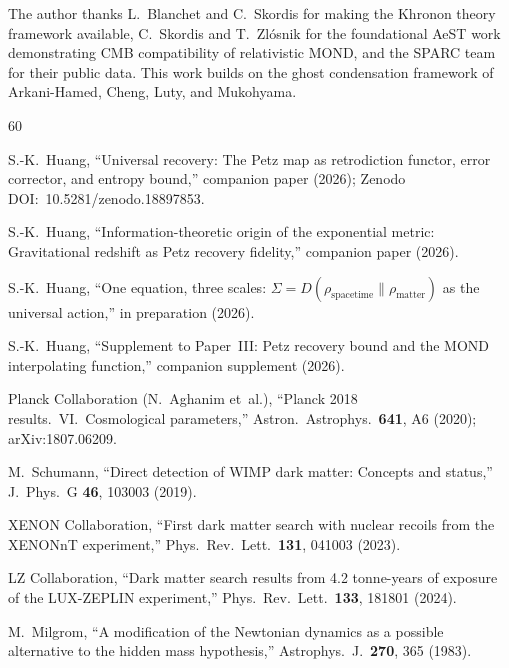 \documentclass[prd,twocolumn,superscriptaddress,longbibliography,floatfix]{revtex4-2}
\begin{document}
\begin{acknowledgments}
The author thanks L.~Blanchet and C.~Skordis for making the
Khronon theory framework available, C.~Skordis and T.~Zl\'{o}snik
for the foundational AeST work demonstrating CMB compatibility
of relativistic MOND, and the SPARC team for their public data.
This work builds on the ghost condensation framework of
Arkani-Hamed, Cheng, Luty, and Mukohyama.
\end{acknowledgments}



\begin{thebibliography}{60}

S.-K.~Huang,
``Universal recovery: The Petz map as retrodiction functor,
error corrector, and entropy bound,''
companion paper (2026);
Zenodo DOI:~10.5281/zenodo.18897853.

S.-K.~Huang,
``Information-theoretic origin of the exponential metric:
Gravitational redshift as Petz recovery fidelity,''
companion paper (2026).

S.-K.~Huang,
``One equation, three scales: $\Sigma = D(\rho_{\mathrm{spacetime}}
\| \rho_{\mathrm{matter}})$ as the universal action,''
in preparation (2026).

S.-K.~Huang,
``Supplement to Paper~III: Petz recovery bound and the
MOND interpolating function,''
companion supplement (2026).

Planck Collaboration (N.~Aghanim et~al.),
``Planck 2018 results.\ VI.\ Cosmological parameters,''
Astron.\ Astrophys.\ \textbf{641}, A6 (2020);
arXiv:1807.06209.

M.~Schumann,
``Direct detection of WIMP dark matter: Concepts and status,''
J.\ Phys.\ G \textbf{46}, 103003 (2019).

XENON Collaboration,
``First dark matter search with nuclear recoils from the
XENONnT experiment,''
Phys.\ Rev.\ Lett.\ \textbf{131}, 041003 (2023).

LZ Collaboration,
``Dark matter search results from 4.2 tonne-years of exposure
of the LUX-ZEPLIN experiment,''
Phys.\ Rev.\ Lett.\ \textbf{133}, 181801 (2024).

M.~Milgrom,
``A modification of the Newtonian dynamics as a possible
alternative to the hidden mass hypothesis,''
Astrophys.\ J.\ \textbf{270}, 365 (1983).


\end{thebibliography}
\end{document}
